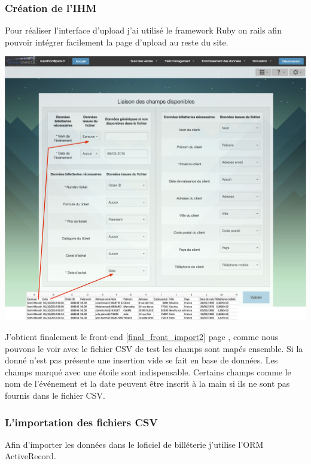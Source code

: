 \subsubsection{Création de l'IHM}
Pour réaliser l'interface d'upload j'ai utilisé le framework Ruby on rails afin pouvoir intégrer facilement la page d'upload au reste du site.

\begin{center}
\includegraphics[scale=0.37]{images/final_front2.png}
\label{final_front_import2}
\end{center}

J'obtient finalement le front-end \ref{final_front_import2} page \pageref{final_front_import2}, comme nous pouvons le voir avec le fichier CSV de test les champs sont mapés ensemble. Si la donné n'est pas présente une insertion vide se fait en base de données. Les champs marqué avec une étoile sont indispensable. Certains champs comme le nom de l'événement et la date peuvent être inscrit à la main si ils ne sont pas fournis dans le fichier CSV.


\subsubsection{L'importation des fichiers CSV}

Afin d'importer les données dans le loficiel de billéterie j'utilise l'ORM ActiveRecord.


